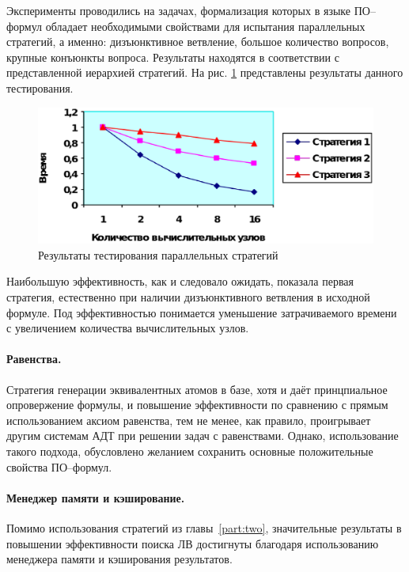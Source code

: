 Эксперименты проводились на задачах, формализация которых в языке ПО--формул обладает необходимыми свойствами для испытания параллельных стратегий, а именно: дизъюнктивное ветвление, большое количество вопросов, крупные конъюнкты вопроса. Результаты находятся в соответствии с представленной иерархией стратегий. На рис. \ref{fig:parallel} представлены результаты данного тестирования.
\begin{figure}[h]
	\centering
	\includegraphics[width=0.7\linewidth]{pics/Parallel.eps}
	\caption{Результаты тестирования параллельных стратегий}
	\label{fig:parallel}
\end{figure}

Наибольшую эффективность, как и следовало ожидать, показала первая стратегия, естественно при наличии дизъюнктивного ветвления в исходной формуле. Под эффективностью понимается уменьшение затрачиваемого времени с увеличением количества вычислительных узлов.


\paragraph{Равенства.}
Стратегия генерации эквивалентных атомов в базе, хотя и даёт принцпиальное опровержение формулы, и повышение эффективности по сравнению с прямым использованием аксиом равенства, тем не менее, как правило, проигрывает другим системам АДТ при решении задач с равенствами. Однако, использование такого подхода, обусловлено желанием сохранить основные положительные свойства ПО--формул.

\paragraph{Менеджер памяти и кэширование.}
Помимо использования стратегий из главы~\ref{part:two}, значительные результаты в повышении эффективности поиска ЛВ достигнуты благодаря использованию менеджера памяти и кэширования результатов.


